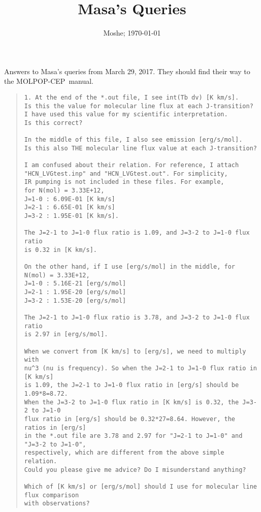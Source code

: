 \documentclass[12pt]{article}
\def\M{MOLPOP-CEP}
\begin{document}
\title                  {\sc Masa's Queries}

\author{ Moshe; \today}
\date{}
\maketitle

Answers to Masa's queries from March 29, 2017. They should find their way to
the \M\ manual.
\begin{quote}
  \begin{verbatim}
1. At the end of the *.out file, I see int(Tb dv) [K km/s].
Is this the value for molecular line flux at each J-transition?
I have used this value for my scientific interpretation.
Is this correct?

In the middle of this file, I also see emission [erg/s/mol].
Is this also THE molecular line flux value at each J-transition?

I am confused about their relation. For reference, I attach
"HCN_LVGtest.inp" and "HCN_LVGtest.out". For simplicity,
IR pumping is not included in these files. For example,
for N(mol) = 3.33E+12,
J=1-0 : 6.09E-01 [K km/s]
J=2-1 : 6.65E-01 [K km/s]
J=3-2 : 1.95E-01 [K km/s].

The J=2-1 to J=1-0 flux ratio is 1.09, and J=3-2 to J=1-0 flux ratio
is 0.32 in [K km/s].

On the other hand, if I use [erg/s/mol] in the middle, for N(mol) = 3.33E+12,
J=1-0 : 5.16E-21 [erg/s/mol]
J=2-1 : 1.95E-20 [erg/s/mol]
J=3-2 : 1.53E-20 [erg/s/mol]

The J=2-1 to J=1-0 flux ratio is 3.78, and J=3-2 to J=1-0 flux ratio
is 2.97 in [erg/s/mol].

When we convert from [K km/s] to [erg/s], we need to multiply with
nu^3 (nu is frequency). So when the J=2-1 to J=1-0 flux ratio in [K km/s]
is 1.09, the J=2-1 to J=1-0 flux ratio in [erg/s] should be 1.09*8=8.72.
When the J=3-2 to J=1-0 flux ratio in [K km/s] is 0.32, the J=3-2 to J=1-0
flux ratio in [erg/s] should be 0.32*27=8.64. However, the ratios in [erg/s]
in the *.out file are 3.78 and 2.97 for "J=2-1 to J=1-0" and "J=3-2 to J=1-0",
respectively, which are different from the above simple relation.
Could you please give me advice? Do I misunderstand anything?

Which of [K km/s] or [erg/s/mol] should I use for molecular line flux comparison
with observations?

  \end{verbatim}
\end{quote}
\end{document}
